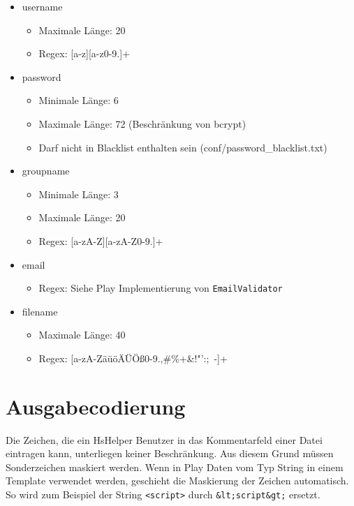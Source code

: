 \documentclass[12pt,DIV14,BCOR10mm,a4paper,parskip=half-,headsepline,headinclude,english,ngerman,bibliography=totocnumbered]{scrreprt}
\begin{document}
\begin{itemize}
	\item username
	 \begin{itemize}
			\item Maximale Länge: 20
			\item Regex: [a-z][a-z0-9.]+
		\end{itemize}


	\item password
	\begin{itemize}
		\item Minimale Länge: 6
		\item Maximale Länge: 72 (Beschränkung von bcrypt)
		\item Darf nicht in Blacklist enthalten sein (conf/password\_blacklist.txt)
	\end{itemize}

	\item groupname
	\begin{itemize}
		\item Minimale Länge: 3
		\item Maximale Länge: 20
		\item Regex: [a-zA-Z][a-zA-Z0-9.]+
	\end{itemize}


	\item email
	\begin{itemize}
		\item Regex: Siehe Play Implementierung von \texttt{EmailValidator}
	\end{itemize}

	\item filename
	\begin{itemize}
		\item Maximale Länge: 40
		\item Regex: [a-zA-ZäüöÄÜÖß0-9.,\#\%+\&!"':;~-]+
	\end{itemize}

\end{itemize}

\section{Ausgabecodierung}
Die Zeichen, die ein HsHelper Benutzer in das Kommentarfeld einer Datei eintragen kann, unterliegen keiner Beschränkung.
Aus diesem Grund müssen Sonderzeichen maskiert werden. Wenn in Play Daten vom Typ String in einem Template verwendet werden, geschieht die Maskierung der Zeichen automatisch. So wird zum Beispiel der String \texttt{<script>} durch \texttt{\&lt;script\&gt;} ersetzt.
\end{document}
